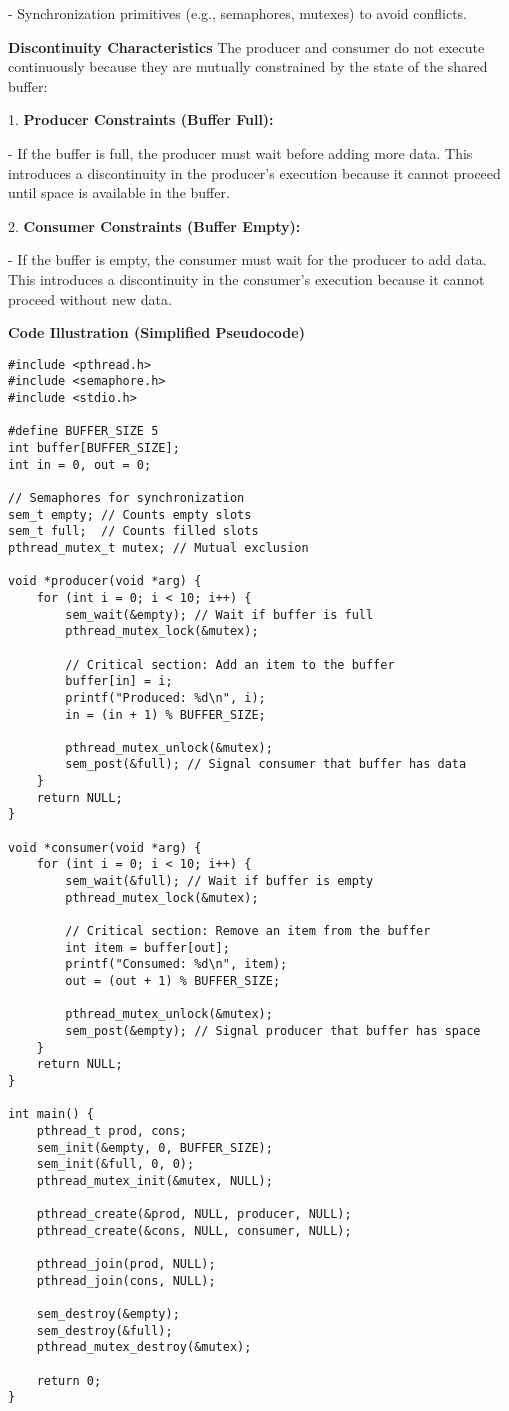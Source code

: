 \documentclass[a4paper]{book}
\begin{document}
- Synchronization primitives (e.g., semaphores, mutexes) to avoid conflicts.

\textbf{Discontinuity Characteristics}
The producer and consumer do not execute continuously because they are mutually constrained by the state of the shared buffer:

1. \textbf{Producer Constraints (Buffer Full):}

   - If the buffer is full, the producer must wait before adding more data. This introduces a discontinuity in the producer's execution because it cannot proceed until space is available in the buffer.

2. \textbf{Consumer Constraints (Buffer Empty):}

   - If the buffer is empty, the consumer must wait for the producer to add data. This introduces a discontinuity in the consumer's execution because it cannot proceed without new data.

\textbf{Code Illustration (Simplified Pseudocode)}

\begin{verbatim}
#include <pthread.h>
#include <semaphore.h>
#include <stdio.h>

#define BUFFER_SIZE 5
int buffer[BUFFER_SIZE];
int in = 0, out = 0;

// Semaphores for synchronization
sem_t empty; // Counts empty slots
sem_t full;  // Counts filled slots
pthread_mutex_t mutex; // Mutual exclusion

void *producer(void *arg) {
    for (int i = 0; i < 10; i++) {
        sem_wait(&empty); // Wait if buffer is full
        pthread_mutex_lock(&mutex);

        // Critical section: Add an item to the buffer
        buffer[in] = i;
        printf("Produced: %d\n", i);
        in = (in + 1) % BUFFER_SIZE;

        pthread_mutex_unlock(&mutex);
        sem_post(&full); // Signal consumer that buffer has data
    }
    return NULL;
}

void *consumer(void *arg) {
    for (int i = 0; i < 10; i++) {
        sem_wait(&full); // Wait if buffer is empty
        pthread_mutex_lock(&mutex);

        // Critical section: Remove an item from the buffer
        int item = buffer[out];
        printf("Consumed: %d\n", item);
        out = (out + 1) % BUFFER_SIZE;

        pthread_mutex_unlock(&mutex);
        sem_post(&empty); // Signal producer that buffer has space
    }
    return NULL;
}

int main() {
    pthread_t prod, cons;
    sem_init(&empty, 0, BUFFER_SIZE);
    sem_init(&full, 0, 0);
    pthread_mutex_init(&mutex, NULL);

    pthread_create(&prod, NULL, producer, NULL);
    pthread_create(&cons, NULL, consumer, NULL);

    pthread_join(prod, NULL);
    pthread_join(cons, NULL);

    sem_destroy(&empty);
    sem_destroy(&full);
    pthread_mutex_destroy(&mutex);

    return 0;
}
\end{verbatim}
\end{document}
